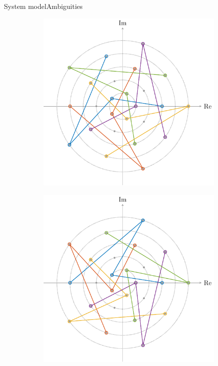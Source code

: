 \documentclass[en]{sdqbeamer}
\begin{document}
\begin{frame}{System model}{Ambiguities}
\begin{figure}[htb]
     \centering
     \begin{subfigure}[b]{0.4\textwidth}
         \centering
         \includegraphics[width=\textwidth]{Eq_class_construction_8.pdf}
     \end{subfigure}
     \hspace{10mm}
     \begin{subfigure}[b]{0.4\textwidth}
         \centering
         \includegraphics[width=\textwidth]{Eq_class_construction_9.pdf}
     \end{subfigure}
\end{figure}

\end{frame}
\end{document}
